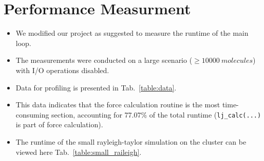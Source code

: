 \documentclass{article}
\begin{document}
\section{Performance Measurment}
\label{sec:perf}

\begin{itemize}
    \item We modified our project as suggested to measure the runtime of the main loop.
    \item The measurements were conducted on a large scenario ($\geq 10000\ molecules$) with I/O operations disabled.
    \item Data for profiling is presented in Tab.\ \ref{table:data}.
    \item This data indicates that the force calculation routine is the most time-consuming section, accounting for 77.07\% of the total runtime (\texttt{lj\_calc(...)} is part of force calculation).
    \item The runtime of the small rayleigh-taylor simulation on the cluster can be viewed here Tab.\ \ref{table:small_raileigh}.
\end{itemize}
\end{document}
